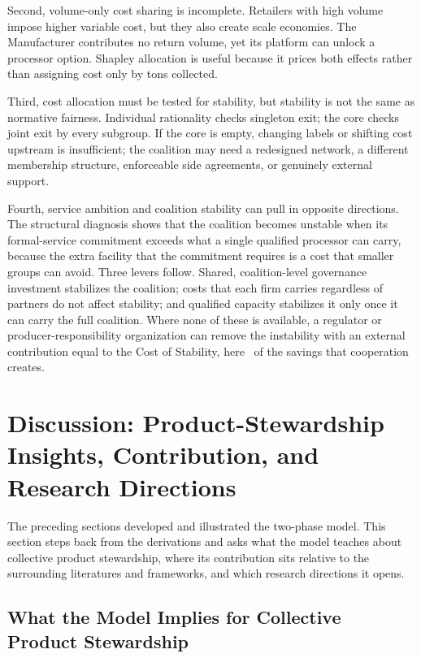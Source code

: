 Second, volume-only cost sharing is incomplete. Retailers with high volume impose higher variable cost, but they also create scale economies. The Manufacturer contributes no return volume, yet its platform can unlock a processor option. Shapley allocation is useful because it prices both effects rather than assigning cost only by tons collected.

Third, cost allocation must be tested for stability, but stability is not the same as normative fairness. Individual rationality checks singleton exit; the core checks joint exit by every subgroup. If the core is empty, changing labels or shifting cost upstream is insufficient; the coalition may need a redesigned network, a different membership structure, enforceable side agreements, or genuinely external support.

Fourth, service ambition and coalition stability can pull in opposite directions. The structural diagnosis shows that the coalition becomes unstable when its formal-service commitment exceeds what a single qualified processor can carry, because the extra facility that the commitment requires is a cost that smaller groups can avoid. Three levers follow. Shared, coalition-level governance investment stabilizes the coalition; costs that each firm carries regardless of partners do not affect stability; and qualified capacity stabilizes it only once it can carry the full coalition. Where none of these is available, a regulator or producer-responsibility organization can remove the instability with an external contribution equal to the Cost of Stability, here \ChFourCoSShareSavings\ of the savings that cooperation creates.

\section{Discussion: Product-Stewardship Insights, Contribution, and Research Directions}
\label{sec:ch4_discussion}

The preceding sections developed and illustrated the two-phase model. This section steps back from the derivations and asks what the model teaches about collective product stewardship, where its contribution sits relative to the surrounding literatures and frameworks, and which research directions it opens.

\subsection{What the Model Implies for Collective Product Stewardship}

